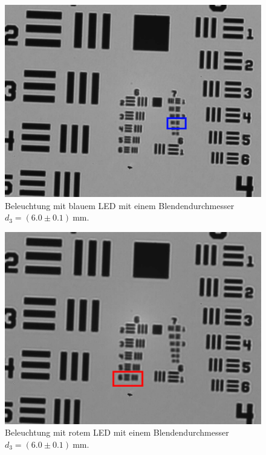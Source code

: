 \documentclass{article}
\begin{document}
\begin{minipage}[t]{.45\textwidth}
\begin{figure}[H]
\includegraphics[scale=0.5]{jw/B_B6_mark.jpg}
\caption{Beleuchtung mit blauem LED mit einem Blendendurchmesser $d_3=(6.0\pm0.1)~$mm.}
\label{fig:bbild_6_blau_jw}
\end{figure}
\end{minipage}
\hfill
\noindent
\begin{minipage}[t]{.45\textwidth}
\begin{figure}[H]
\includegraphics[scale=0.5]{jw/R_B6_mark.jpg}
\caption{Beleuchtung mit rotem LED mit einem Blendendurchmesser $d_3=(6.0\pm0.1)~$mm.}
\label{fig:bbild_6_rot_jw}
\end{figure}
\end{minipage}
\end{document}
